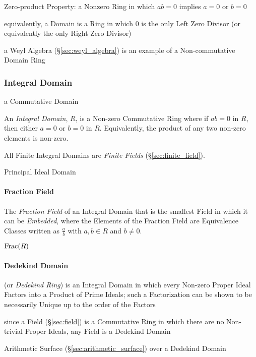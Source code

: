 Zero-product Property: a Nonzero Ring in which $ab = 0$ implies $a = 0$ or $b =
0$

equivalently, a Domain is a Ring in which $0$ is the only Left Zero Divisor (or
equivalently the only Right Zero Divisor)

a Weyl Algebra (\S\ref{sec:weyl_algebra}) is an example of a Non-commutative
Domain Ring



\subsubsection{Integral Domain}\label{sec:integral_domain}

a Commutative Domain

An \emph{Integral Domain}, $R$, is a Non-zero Commutative Ring where
if $ab = 0$ in $R$, then either $a = 0$ or $b = 0$ in $R$.
Equivalently, the product of any two non-zero elements is non-zero.

All Finite Integral Domains are \emph{Finite Fields}
(\S\ref{sec:finite_field}).

Principal Ideal Domain



\paragraph{Fraction Field}\label{sec:fraction_field}\hfill

The \emph{Fraction Field} of an Integral Domain that is the smallest Field in
which it can be \emph{Embedded}, where the Elements of the Fraction Field are
Equivalence Classes written as $\frac{a}{b}$ with $a, b \in R$ and $b \neq 0$.

$\mathrm{Frac}(R)$



\paragraph{Dedekind Domain}\label{sec:dedekind_domain}\hfill

(or \emph{Dedekind Ring}) is an Integral Domain in which every Non-zero Proper
Ideal Factors into a Product of Prime Ideals; such a Factorization can be shown
to be necessarily Unique up to the order of the Factors

since a Field (\S\ref{sec:field}) is a Commutative Ring in which there are no
Non-trivial Proper Ideals, any Field is a Dedekind Domain

\fist Arithmetic Surface (\S\ref{sec:arithmetic_surface}) over a Dedekind Domain



